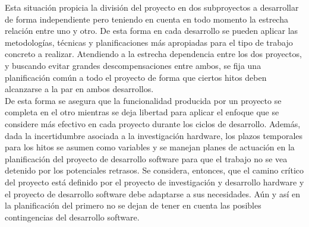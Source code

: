 	Esta situación propicia la división del proyecto en dos subproyectos a desarrollar de forma independiente pero teniendo en cuenta en todo momento la estrecha relación entre uno y otro. De esta forma en cada desarrollo se pueden aplicar las metodologías, técnicas y planificaciones más apropiadas para el tipo de trabajo concreto a realizar. Atendiendo a la estrecha dependencia entre los dos proyectos, y buscando evitar grandes descompensaciones entre ambos, se fija una planificación común a todo el proyecto de forma que ciertos hitos deben alcanzarse a la par en ambos desarrollos.\\

	De esta forma se asegura que la funcionalidad producida por un proyecto se completa en el otro mientras se deja libertad para aplicar el enfoque que se considere más efectivo en cada proyecto durante los ciclos de desarrollo. Además, dada la incertidumbre asociada a la investigación hardware, los plazos temporales para los hitos se asumen como variables y se manejan planes de actuación en la planificación del proyecto de desarrollo software para que el trabajo no se vea detenido por los potenciales retrasos. Se considera, entonces, que el camino crítico del proyecto está definido por el proyecto de investigación y desarrollo hardware y el proyecto de desarrollo software debe adaptarse a sus necesidades. Aún y así en la planificación del primero no se dejan de tener en cuenta las posibles contingencias del desarrollo software.\\

